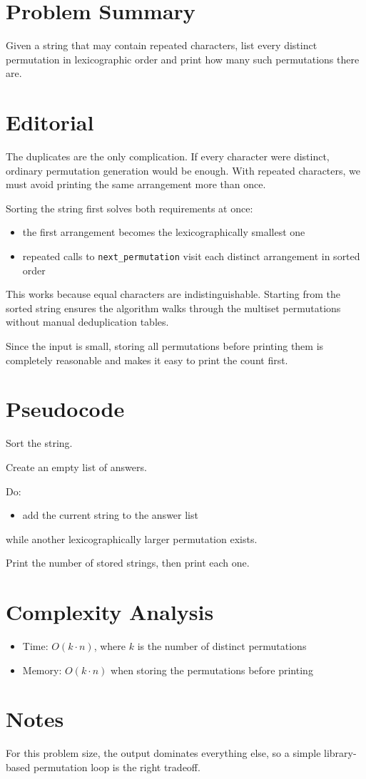 \section{Problem Summary}
Given a string that may contain repeated characters, list every distinct permutation in lexicographic order and print how many such permutations there are.

\section{Editorial}
The duplicates are the only complication. If every character were distinct, ordinary permutation generation would be enough. With repeated characters, we must avoid printing the same arrangement more than once.

Sorting the string first solves both requirements at once:
\begin{itemize}
\item the first arrangement becomes the lexicographically smallest one
\item repeated calls to \texttt{next\_permutation} visit each distinct arrangement in sorted order
\end{itemize}

This works because equal characters are indistinguishable. Starting from the sorted string ensures the algorithm walks through the multiset permutations without manual deduplication tables.

Since the input is small, storing all permutations before printing them is completely reasonable and makes it easy to print the count first.

\section{Pseudocode}
Sort the string.

Create an empty list of answers.

Do:
\begin{itemize}
\item add the current string to the answer list
\end{itemize}
while another lexicographically larger permutation exists.

Print the number of stored strings, then print each one.

\section{Complexity Analysis}
\begin{itemize}
\item Time: \(O(k \cdot n)\), where \(k\) is the number of distinct permutations
\item Memory: \(O(k \cdot n)\) when storing the permutations before printing
\end{itemize}

\section{Notes}
For this problem size, the output dominates everything else, so a simple library-based permutation loop is the right tradeoff.
